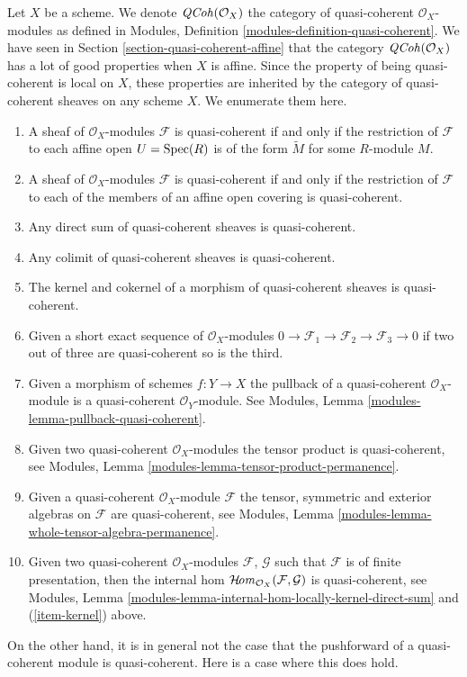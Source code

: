 \noindent
Let $X$ be a scheme. We denote $\mathit{QCoh}(\mathcal{O}_X)$ the
category of quasi-coherent $\mathcal{O}_X$-modules as defined in
Modules, Definition \ref{modules-definition-quasi-coherent}.
We have seen in
Section \ref{section-quasi-coherent-affine}
that the category $\mathit{QCoh}(\mathcal{O}_X)$ has a lot of good properties
when $X$ is affine. Since the property of being quasi-coherent is
local on $X$, these properties are inherited by the category
of quasi-coherent sheaves on any scheme $X$. We enumerate them here.
\begin{enumerate}
\item A sheaf of $\mathcal{O}_X$-modules $\mathcal{F}$ is
quasi-coherent if and only if the restriction of $\mathcal{F}$
to each affine open $U = \mathop{\mathrm{Spec}}(R)$ is of the form
$\widetilde M$ for some $R$-module $M$.
\item A sheaf of $\mathcal{O}_X$-modules $\mathcal{F}$ is
quasi-coherent if and only if the restriction of $\mathcal{F}$
to each of the members of an affine open covering is quasi-coherent.
\item Any direct sum of quasi-coherent sheaves is quasi-coherent.
\item Any colimit of quasi-coherent sheaves is quasi-coherent.
\item
\label{item-kernel}
The kernel and cokernel of a morphism of quasi-coherent sheaves
is quasi-coherent.
\item Given a short exact sequence of $\mathcal{O}_X$-modules
$0 \to \mathcal{F}_1 \to \mathcal{F}_2 \to \mathcal{F}_3 \to 0$
if two out of three are quasi-coherent so is the third.
\item Given a morphism of schemes $f : Y \to X$ the pullback
of a quasi-coherent $\mathcal{O}_X$-module is a quasi-coherent
$\mathcal{O}_Y$-module. See
Modules, Lemma \ref{modules-lemma-pullback-quasi-coherent}.
\item Given two quasi-coherent $\mathcal{O}_X$-modules
the tensor product is quasi-coherent, see
Modules, Lemma \ref{modules-lemma-tensor-product-permanence}.
\item Given a quasi-coherent $\mathcal{O}_X$-module $\mathcal{F}$
the tensor, symmetric and exterior algebras on $\mathcal{F}$
are quasi-coherent, see
Modules, Lemma \ref{modules-lemma-whole-tensor-algebra-permanence}.
\item Given two quasi-coherent $\mathcal{O}_X$-modules
$\mathcal{F}$, $\mathcal{G}$ such that $\mathcal{F}$
is of finite presentation, then the internal hom
$\mathop{\mathcal{H}\!\mathit{om}}\nolimits_{\mathcal{O}_X}(\mathcal{F}, \mathcal{G})$
is quasi-coherent, see
Modules, Lemma \ref{modules-lemma-internal-hom-locally-kernel-direct-sum}
and (\ref{item-kernel}) above.
\end{enumerate}
On the other hand, it is in general not the case that the
pushforward of a quasi-coherent module is quasi-coherent.
Here is a case where this does hold.

